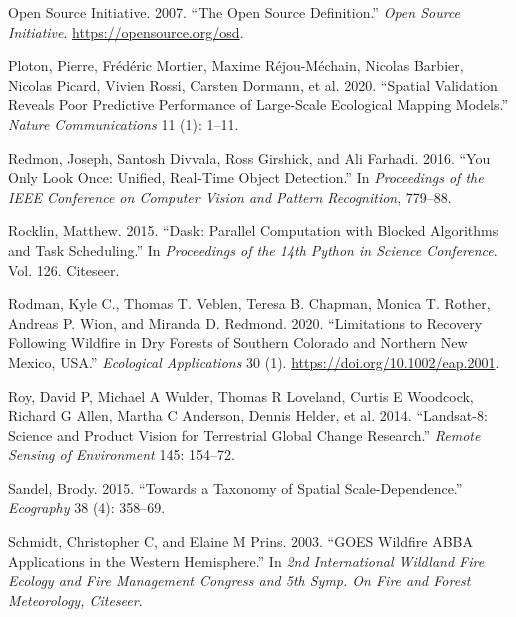 \documentclass[
  12pt,
]{article}
\newlength{\cslhangindent}
\newlength{\cslentryspacingunit} %
\newenvironment{CSLReferences}[2] %
 {%
  \setlength{\parindent}{0pt}
  \ifodd #1
  \let\oldpar\par
  \def\par{\hangindent=\cslhangindent\oldpar}
  \fi
  \setlength{\parskip}{#2\cslentryspacingunit}
 }%
 {}
\begin{document}
\begin{CSLReferences}{1}{0}
\leavevmode{}%
Open Source Initiative. 2007. {``The {Open} {Source} {Definition}.''}
\emph{Open Source Initiative}. \url{https://opensource.org/osd}.

\leavevmode{}%
Ploton, Pierre, Frédéric Mortier, Maxime Réjou-Méchain, Nicolas Barbier,
Nicolas Picard, Vivien Rossi, Carsten Dormann, et al. 2020. {``Spatial
Validation Reveals Poor Predictive Performance of Large-Scale Ecological
Mapping Models.''} \emph{Nature Communications} 11 (1): 1--11.

\leavevmode{}%
Redmon, Joseph, Santosh Divvala, Ross Girshick, and Ali Farhadi. 2016.
{``You Only Look Once: Unified, Real-Time Object Detection.''} In
\emph{Proceedings of the IEEE Conference on Computer Vision and Pattern
Recognition}, 779--88.

\leavevmode{}%
Rocklin, Matthew. 2015. {``Dask: Parallel Computation with Blocked
Algorithms and Task Scheduling.''} In \emph{Proceedings of the 14th
Python in Science Conference}. Vol. 126. Citeseer.

\leavevmode{}%
Rodman, Kyle C., Thomas T. Veblen, Teresa B. Chapman, Monica T. Rother,
Andreas P. Wion, and Miranda D. Redmond. 2020. {``Limitations to
Recovery Following Wildfire in Dry Forests of Southern {Colorado} and
Northern {New} {Mexico}, {USA}.''} \emph{Ecological Applications} 30
(1). \url{https://doi.org/10.1002/eap.2001}.

\leavevmode{}%
Roy, David P, Michael A Wulder, Thomas R Loveland, Curtis E Woodcock,
Richard G Allen, Martha C Anderson, Dennis Helder, et al. 2014.
{``Landsat-8: Science and Product Vision for Terrestrial Global Change
Research.''} \emph{Remote Sensing of Environment} 145: 154--72.

\leavevmode{}%
Sandel, Brody. 2015. {``Towards a Taxonomy of Spatial
Scale-Dependence.''} \emph{Ecography} 38 (4): 358--69.

\leavevmode{}%
Schmidt, Christopher C, and Elaine M Prins. 2003. {``{GOES} Wildfire
{ABBA} Applications in the Western Hemisphere.''} In \emph{2nd
{International} {Wildland} {Fire} {Ecology} and {Fire} {Management}
{Congress} and 5th {Symp}. On {Fire} and {Forest} {Meteorology},
{Citeseer}}.


\end{CSLReferences}
\end{document}
